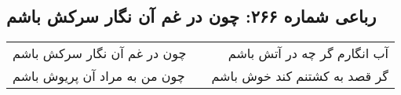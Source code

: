 \begin{center}
\section*{رباعی شماره ۲۶۶: چون در غم آن نگار سرکش باشم}
\label{sec:sh266}
\begin{longtable}{l p{0.5cm} r}
چون در غم آن نگار سرکش باشم
&&
آب انگارم گر چه در آتش باشم
\\
چون من به مراد آن پریوش باشم
&&
گر قصد به کشتنم کند خوش باشم
\\
\end{longtable}
\end{center}
